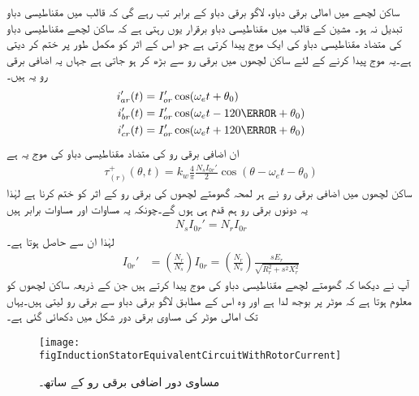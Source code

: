 ساکن لچھے میں امالی برقی دباو،  لاگو برقی دباو کے برابر تب رہے گی کہ قالب میں مقناطیسی دباو تبدیل نہ ہو۔ مشین کے قالب میں مقناطیسی دباو برقرار یوں رہتی ہے کہ ساکن لچھے  مقناطیسی دباو   کی متضاد مقناطیسی دباو کی ایک موج پیدا کرتی ہے جو اس کے اثر کو مکمل طور پر ختم کر دیتی ہے۔یہ موج پیدا کرنے کے لئے ساکن لچھوں میں برقی رو  سے بڑھ کر  ہو جاتی ہے جہاں یہ اضافی برقی رو یہ ہیں۔
\begin{gather}
\begin{aligned}\label{مساوات_امالی_تین_رو_الف}
i_{ar}'(t)&=I_{or}' \cos (\omega_e t+\theta_0)\\
i_{br}'(t)&=I_{or}' \cos (\omega_e t-120\degree+\theta_0)\\
i_{cr}'(t)&=I_{or}' \cos (\omega_e t+120\degree+\theta_0)
\end{aligned}
\end{gather}
ان اضافی برقی رو کی متضاد مقناطیسی دباو کی موج یہ ہے
\begin{align}
\tau_{(r)}^+(\theta,t)=k_w \frac{4}{\pi}\frac{N_s I_{0r}'}{2} \cos (\theta-\omega_e t -\theta_0)
\end{align}
ساکن لچھوں میں اضافی برقی رو نے ہر لمحہ گھومتے لچھوں کی برقی رو کے اثر کو ختم کرنا ہے لہٰذا یہ دونوں برقی رو ہم قدم ہی ہوں گے۔چونکہ یہ مساوات اور مساوات   برابر ہیں
\begin{align}
N_s I_{0r}'=N_r I_{0r}
\end{align}
 لہٰذا ان سے حاصل ہوتا ہے۔
\begin{align}
I_{0r}'&=\left(\frac{N_r}{N_s}\right) I_{0r}=\left(\frac{N_r}{N_s}\right) \frac{s E_r}{\sqrt{R_r^2+s^2 X_r^2}}
\end{align}
آپ نے دیکھا کہ گھومتے لچھے مقناطیسی دباو کی موج پیدا کرتے ہیں جن کے ذریعہ ساکن لچھوں کو معلوم ہوتا ہے کہ موٹر پر بوجھ لدا ہے اور وہ اس کے مطابق لاگو برقی دباو سے برقی رو لیتی ہیں۔یہاں تک امالی موٹر کی مساوی برقی دور شکل   میں دکھائی گئی ہے۔
\begin{figure}
\centering
\texttt{[image: figInductionStatorEquivalentCircuitWithRotorCurrent]}
\caption{مساوی دور اضافی برقی رو کے ساتھ۔}
\label{شکل_امالی_ساکن_کا_مساوی_دور_بمع_گھومتے_لچھے_کی_رو}
\end{figure}

